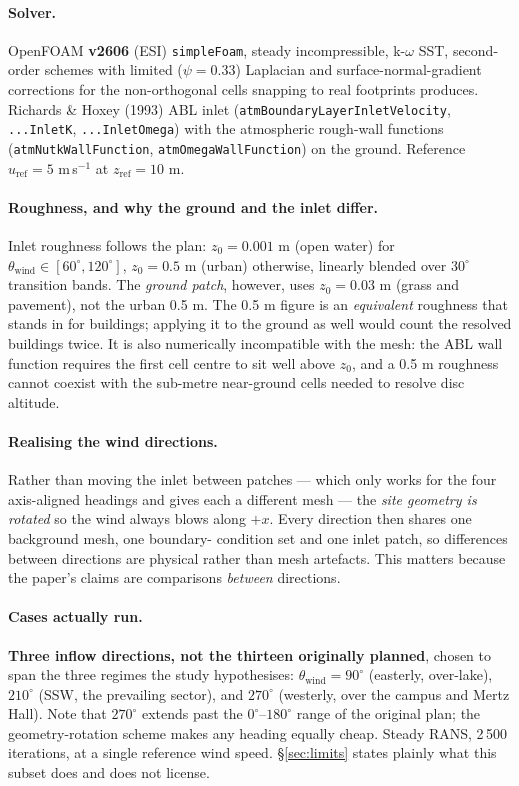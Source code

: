 \documentclass[11pt,letterpaper]{article}
\begin{document}
\paragraph{Solver.} OpenFOAM \textbf{v2606} (ESI) \texttt{simpleFoam}, steady
incompressible, k-$\omega$ SST, second-order schemes with limited
($\psi = 0.33$) Laplacian and surface-normal-gradient corrections for the
non-orthogonal cells snapping to real footprints produces. Richards \& Hoxey
(1993) ABL inlet (\texttt{atmBoundaryLayerInletVelocity}, \texttt{...InletK},
\texttt{...InletOmega}) with the atmospheric rough-wall functions
(\texttt{atmNutkWallFunction}, \texttt{atmOmegaWallFunction}) on the ground.
Reference $u_{\text{ref}} = 5$ m\,s$^{-1}$ at $z_{\text{ref}} = 10$ m.

\paragraph{Roughness, and why the ground and the inlet differ.} Inlet
roughness follows the plan: $z_0 = 0.001$ m (open water) for
$\theta_{\text{wind}} \in [60^\circ, 120^\circ]$, $z_0 = 0.5$ m (urban)
otherwise, linearly blended over $30^\circ$ transition bands. The
\emph{ground patch}, however, uses $z_0 = 0.03$ m (grass and pavement), not the
urban 0.5 m. The 0.5 m figure is an \emph{equivalent} roughness that stands in
for buildings; applying it to the ground as well would count the resolved
buildings twice. It is also numerically incompatible with the mesh: the ABL
wall function requires the first cell centre to sit well above $z_0$, and a
0.5 m roughness cannot coexist with the sub-metre near-ground cells needed to
resolve disc altitude.

\paragraph{Realising the wind directions.} Rather than moving the inlet between
patches --- which only works for the four axis-aligned headings and gives each a
different mesh --- the \emph{site geometry is rotated} so the wind always blows
along $+x$. Every direction then shares one background mesh, one boundary-
condition set and one inlet patch, so differences between directions are
physical rather than mesh artefacts. This matters because the paper's claims
are comparisons \emph{between} directions.

\paragraph{Cases actually run.} \textbf{Three inflow directions, not the
thirteen originally planned}, chosen to span the three regimes the study
hypothesises: $\theta_{\text{wind}} = 90^\circ$ (easterly, over-lake),
$210^\circ$ (SSW, the prevailing sector), and $270^\circ$ (westerly, over the
campus and Mertz Hall). Note that $270^\circ$ extends past the
$0^\circ$--$180^\circ$ range of the original plan; the geometry-rotation scheme
makes any heading equally cheap. Steady RANS, 2\,500 iterations, at a single
reference wind speed. \S\ref{sec:limits} states plainly what this subset does
and does not license.
\end{document}

